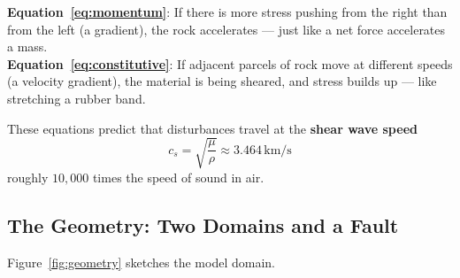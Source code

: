 \documentclass[12pt, a4paper]{article}
\theoremstyle{definition}
\begin{document}
\begin{tcolorbox}[highlight=myorange, title=Plain-Language Interpretation]
  \textbf{Equation~\eqref{eq:momentum}}: If there is more stress pushing from
  the right than from the left (a gradient), the rock accelerates — just like
  a net force accelerates a mass. \\[4pt]
  \textbf{Equation~\eqref{eq:constitutive}}: If adjacent parcels of rock move
  at different speeds (a velocity gradient), the material is being sheared, and
  stress builds up — like stretching a rubber band.
\end{tcolorbox}

These equations predict that disturbances travel at the \textbf{shear wave speed}
\[
  c_s = \sqrt{\frac{\mu}{\rho}} \approx 3.464\,\text{km/s}
\]
roughly $10{,}000$ times the speed of sound in air.

\subsection{The Geometry: Two Domains and a Fault}
\label{sec:geometry}

Figure~\ref{fig:geometry} sketches the model domain.
\end{document}
